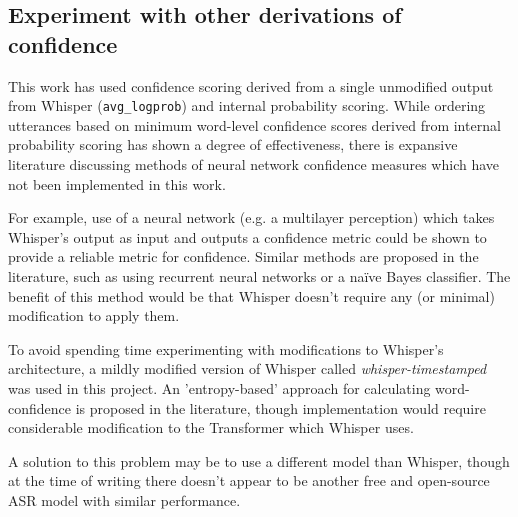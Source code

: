 \subsection{Experiment with other derivations of confidence}

This work has used confidence scoring derived from a single unmodified output from Whisper (\texttt{avg\_logprob}) and internal probability scoring.
While ordering utterances based on minimum word-level confidence scores derived from internal probability scoring has shown a degree of effectiveness, there is expansive literature discussing methods of neural network confidence measures which have not been implemented in this work.

For example, use of a neural network (e.g. a multilayer perception) which takes Whisper's output as input and outputs a confidence metric could be shown to provide a reliable metric for confidence.
Similar methods are proposed in the literature, such as using recurrent neural networks\cite{huang2013predicting, kalgaonkar2015estimating} or a na\"{i}ve Bayes classifier\cite{sanchis2011word}.
The benefit of this method would be that Whisper doesn't require any (or minimal) modification to apply them.

To avoid spending time experimenting with modifications to Whisper's architecture, a mildly modified version of Whisper called \emph{whisper-timestamped}\cite{whisper-timestamped} was used in this project.
An 'entropy-based' approach for calculating word-confidence is proposed in the literature\cite{laptev2023fast, qiu2021learning}, though implementation would require considerable modification to the Transformer which Whisper uses.

A solution to this problem may be to use a different model than Whisper, though at the time of writing there doesn't appear to be another free and open-source ASR model with similar performance.

